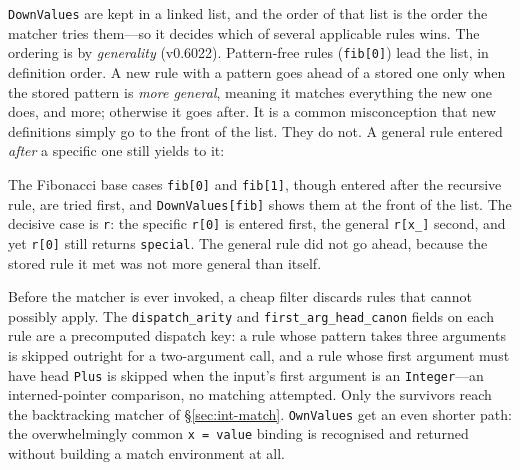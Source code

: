 \texttt{DownValues} are kept in a linked list, and the order of that list is the order
the matcher tries them---so it decides which of several applicable rules wins. The
ordering is by \emph{generality} (v0.6022).
Pattern-free rules (\texttt{fib[0]}) lead the list, in definition order. A new rule
with a pattern goes ahead of a stored one only when the stored pattern is \emph{more
general}, meaning it matches everything the new one does, and more; otherwise it goes
after. It is a common misconception that new definitions simply go to the front of
the list. They do not. A general rule entered \emph{after} a specific one still
yields to it:


The Fibonacci base cases \texttt{fib[0]} and \texttt{fib[1]}, though entered after the
recursive rule, are tried first, and \texttt{DownValues[fib]} shows them at the front
of the list. The decisive case is \texttt{r}: the specific \texttt{r[0]} is entered
first, the general \texttt{r[x\_]} second, and yet \texttt{r[0]} still returns
\texttt{special}. The general rule did not go ahead, because the stored rule it met
was not more general than itself.



Before the matcher is ever invoked, a cheap filter discards rules that cannot possibly
apply. The \texttt{dispatch\_arity} and \texttt{first\_arg\_head\_canon} fields on each
rule are a precomputed dispatch key: a rule whose pattern takes three arguments is
skipped outright for a two-argument call, and a rule whose first argument must have
head \texttt{Plus} is skipped when the input's first argument is an
\texttt{Integer}---an interned-pointer comparison, no matching attempted. Only the
survivors reach the backtracking matcher of \S\ref{sec:int-match}.
\texttt{OwnValues} get an even shorter path: the overwhelmingly common
\texttt{x = value} binding is recognised and returned without building a match
environment at all.

